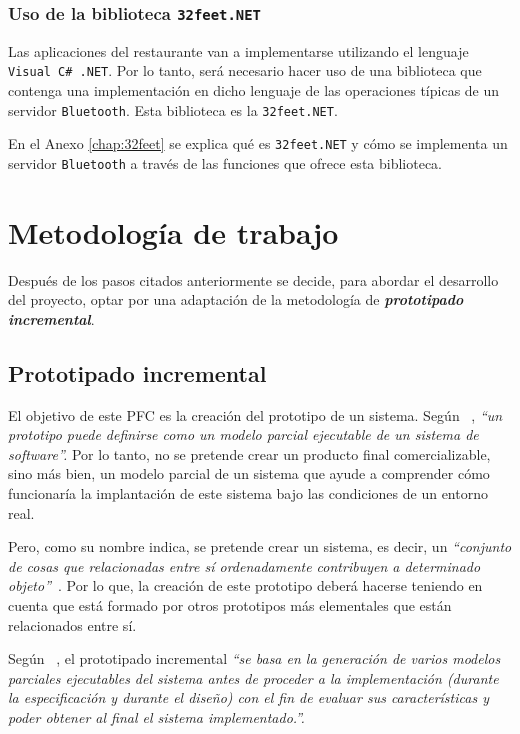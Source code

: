   \subsubsection{Uso de la biblioteca \texttt{32feet.NET}}
Las aplicaciones del restaurante van a implementarse utilizando el lenguaje
\texttt{Visual C\# .NET}. Por lo tanto, será necesario hacer uso de una 
biblioteca que contenga una implementación en dicho lenguaje de las 
operaciones típicas de un servidor \texttt{Bluetooth}. Esta biblioteca es la
\texttt{32feet.NET}.

En el Anexo \ref{chap:32feet} se explica qué es \texttt{32feet.NET} y cómo se
implementa un servidor \texttt{Bluetooth} a través de las funciones que
ofrece esta biblioteca.

\section{Metodología de trabajo}
\label{sec:workingMethodology}
Después de los pasos citados anteriormente se decide, para abordar el
desarrollo del proyecto, optar por una adaptación de la metodología de 
\emph{\textbf{prototipado incremental}}.

  \subsection{Prototipado incremental}
El objetivo de este \acs{PFC} es la creación del prototipo de un sistema.
Según ~\cite{bib:software_engineering}, \emph{``un prototipo puede definirse
como un modelo parcial ejecutable de un sistema de software''.} Por lo tanto, 
no se pretende crear un producto final comercializable, sino más bien, un
modelo parcial de un sistema que ayude a comprender cómo funcionaría la
implantación de este sistema bajo las condiciones de un entorno real.

Pero, como su nombre indica, se pretende crear un sistema, es decir, un
\emph{``conjunto de cosas que relacionadas entre sí ordenadamente contribuyen 
a determinado objeto''}~\cite{bib:rae}. Por lo que, la creación de este 
prototipo deberá hacerse teniendo en cuenta que está formado por otros 
prototipos más elementales que están relacionados entre sí.

Según ~\cite{bib:software_engineering}, el prototipado incremental
\emph{``se basa en la generación de varios modelos parciales ejecutables del 
sistema antes de proceder a la implementación (durante la especificación y 
durante el diseño) con el fin de evaluar sus características y poder obtener al 
final el sistema implementado.''.}

